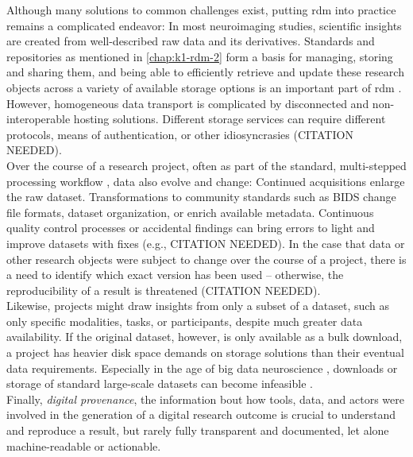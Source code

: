Although many solutions to common challenges exist, putting \gls{rdm} into practice remains a complicated endeavor:
In most neuroimaging studies, scientific insights are created from well-described raw data and its derivatives.
Standards and repositories as mentioned in \cref{chap:k1-rdm-2} form a basis for managing, storing and sharing them, and being able to efficiently retrieve and update these research objects across a variety of available storage options is an important part of \gls{rdm} \citep{borghi2018data}.
However, homogeneous data transport is complicated by disconnected and non-interoperable hosting solutions.
Different storage services can require different protocols, means of authentication, or other idiosyncrasies (CITATION NEEDED). \\
Over the course of a research project, often as part of the standard, multi-stepped processing workflow \citep{poline2011}, data also evolve and change:
Continued acquisitions enlarge the raw dataset.
Transformations to community standards such as \gls{BIDS} \citep{gorgolewski2016brain} change file formats, dataset organization, or enrich available metadata.
Continuous quality control processes or accidental findings can bring errors to light and improve datasets with fixes (e.g., CITATION NEEDED).
In the case that data or other research objects were subject to change over the course of a project, there is a need to identify which exact version has been used -- otherwise, the reproducibility of a result is threatened (CITATION NEEDED). \\
Likewise, projects might draw insights from only a subset of a dataset, such as only specific modalities, tasks, or participants, despite much greater data availability.
If the original dataset, however, is only available as a bulk download, a project has heavier disk space demands on storage solutions than their eventual data requirements.
Especially in the age of big data neuroscience \citep{bzdok2017inference}, downloads or storage of standard large-scale datasets can become infeasible \citep{horien2021hitchhiker} \citep{grisham2016proposed}. \\
Finally, \textit{digital provenance}, the information bout how tools, data, and actors were involved in the generation of a digital research outcome is crucial to understand and reproduce a result, but rarely fully transparent and documented, let alone machine-readable or actionable.


